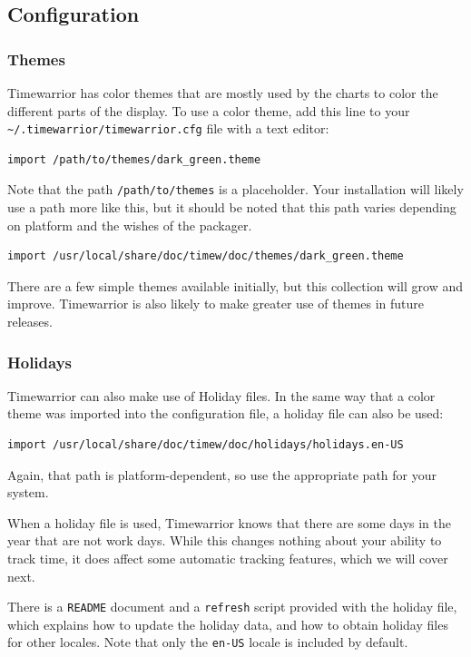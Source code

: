 \documentclass[t,handout]{beamer}
\begin{document}
\subsection{Configuration}

\begin{frame}[fragile]\frametitle{Themes}
    Timewarrior has color themes that are mostly used by the charts to color the different parts of the display. To use a color theme, add this line to your \verb=~/.timewarrior/timewarrior.cfg= file with a text editor:

    \begin{lstlisting}
import /path/to/themes/dark_green.theme\end{lstlisting}

    Note that the path \verb=/path/to/themes= is a placeholder. Your installation will likely use a path more like this, but it should be noted that this path varies depending on platform and the wishes of the packager.

    \begin{lstlisting}
import /usr/local/share/doc/timew/doc/themes/dark_green.theme\end{lstlisting}

    There are a few simple themes available initially, but this collection will grow and improve. Timewarrior is also likely to make greater use of themes in future releases.
\end{frame}

\begin{frame}[fragile]\frametitle{Holidays}
    Timewarrior can also make use of Holiday files. In the same way that a color theme was imported into the configuration file, a holiday file can also be used:

    \begin{lstlisting}
import /usr/local/share/doc/timew/doc/holidays/holidays.en-US\end{lstlisting}

    Again, that path is platform-dependent, so use the appropriate path for your system.

    When a holiday file is used, Timewarrior knows that there are some days in the year that are not work days. While this changes nothing about your ability to track time, it does affect some automatic tracking features, which we will cover next.

    There is a \verb=README= document and a \verb=refresh= script provided with the holiday file, which explains how to update the holiday data, and how to obtain holiday files for other locales. Note that only the \verb=en-US= locale is included by default.
\end{frame}
\end{document}
